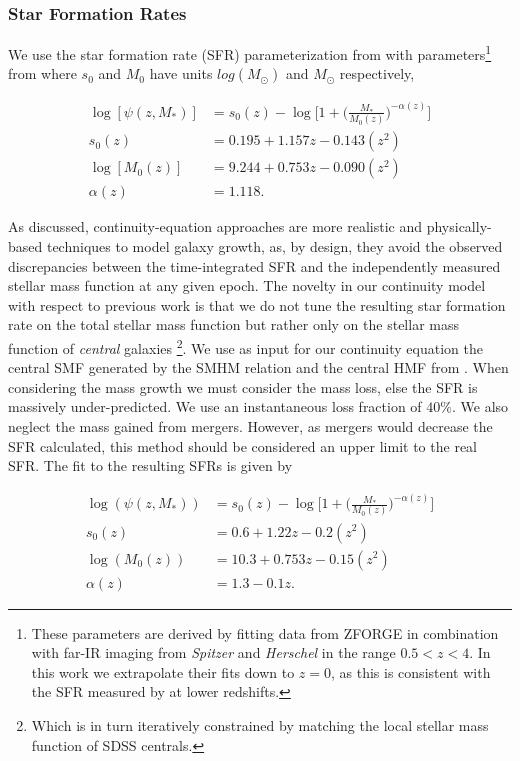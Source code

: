 \subsubsection{Star Formation Rates}
We use the star formation rate (SFR) parameterization from \citet{Lee2015A1.3} with parameters\footnote{These parameters are derived by fitting data from ZFORGE in combination with far-IR imaging from \textit{Spitzer} and \textit{Herschel} in the range $0.5<z<4$. In this work we extrapolate their fits down to $z = 0$, as this is consistent with the SFR measured by  \cite{Salim2007UVUniverse} at lower redshifts.} from \citet{Tomczak2016THE4} where $s_0$ and $M_0$ have units $log(M_{\odot})$ and $M_{\odot}$ respectively,

\begin{equation}
\begin{split}
\label{eqn:SFR}
\log[\psi(z, M_*)] &= s_0(z) - \log \Big[ 1 + \Big(\frac{M_*}{M_0(z)}\Big)^{-\alpha(z)}\Big] \\
s_0(z) &= 0.195 + 1.157z - 0.143(z^2) \\
\log[M_0(z)] &= 9.244 + 0.753z - 0.090(z^2) \\
\alpha(z) &= 1.118.
\end{split}
\end{equation}

As discussed, continuity-equation approaches are more realistic and physically-based techniques to model galaxy growth, as, by design, they avoid the observed discrepancies between the time-integrated SFR and the independently measured stellar mass function at any given epoch. The novelty in our continuity model with respect to previous work is that we do not tune the resulting star formation rate on the total stellar mass function but rather only on the stellar mass function of \textit{central} galaxies \footnote{Which is in turn iteratively constrained by matching the local stellar mass function of SDSS centrals.}. We use as input for our continuity equation the central SMF generated by the SMHM relation and the central HMF from \cite{Tinker2010THETESTS}. When considering the mass growth we must consider the mass loss, else the SFR is massively under-predicted. We use an instantaneous loss fraction of $40\%$. We also neglect the mass gained from mergers. However, as mergers would decrease the SFR calculated, this method should be considered an upper limit to the real SFR. The fit to the resulting SFRs is given by

\begin{equation}
\begin{split}
\label{eqn:SFR_CE}
\log(\psi(z, M_*)) &= s_0(z) - \log \Big[ 1 + \Big(\frac{M_*}{M_0(z)}\Big)^{-\alpha(z)}\Big] \\
s_0(z) &= 0.6 + 1.22z - 0.2(z^2) \\
\log(M_0(z)) &= 10.3 + 0.753z - 0.15(z^2) \\
\alpha(z) &= 1.3 - 0.1z.
\end{split}
\end{equation}


